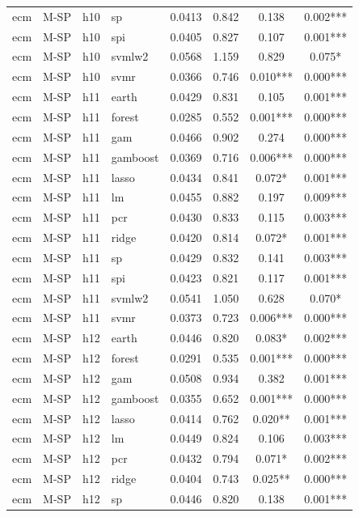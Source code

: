 \begin{ThreePartTable}
\begin{longtable}[t]{llclcccc}
ecm & M-SP & h10 & sp & 0.0413 & 0.842 & 0.138 & 0.002***\\
ecm & M-SP & h10 & spi & 0.0405 & 0.827 & 0.107 & 0.001***\\
ecm & M-SP & h10 & svmlw2 & 0.0568 & 1.159 & 0.829 & 0.075*\\
ecm & M-SP & h10 & svmr & 0.0366 & 0.746 & 0.010*** & 0.000***\\
\addlinespace
ecm & M-SP & h11 & earth & 0.0429 & 0.831 & 0.105 & 0.001***\\
ecm & M-SP & h11 & forest & 0.0285 & 0.552 & 0.001*** & 0.000***\\
ecm & M-SP & h11 & gam & 0.0466 & 0.902 & 0.274 & 0.000***\\
ecm & M-SP & h11 & gamboost & 0.0369 & 0.716 & 0.006*** & 0.000***\\
ecm & M-SP & h11 & lasso & 0.0434 & 0.841 & 0.072* & 0.001***\\
ecm & M-SP & h11 & lm & 0.0455 & 0.882 & 0.197 & 0.009***\\
ecm & M-SP & h11 & pcr & 0.0430 & 0.833 & 0.115 & 0.003***\\
ecm & M-SP & h11 & ridge & 0.0420 & 0.814 & 0.072* & 0.001***\\
ecm & M-SP & h11 & sp & 0.0429 & 0.832 & 0.141 & 0.003***\\
ecm & M-SP & h11 & spi & 0.0423 & 0.821 & 0.117 & 0.001***\\
ecm & M-SP & h11 & svmlw2 & 0.0541 & 1.050 & 0.628 & 0.070*\\
ecm & M-SP & h11 & svmr & 0.0373 & 0.723 & 0.006*** & 0.000***\\
\addlinespace
ecm & M-SP & h12 & earth & 0.0446 & 0.820 & 0.083* & 0.002***\\
ecm & M-SP & h12 & forest & 0.0291 & 0.535 & 0.001*** & 0.000***\\
ecm & M-SP & h12 & gam & 0.0508 & 0.934 & 0.382 & 0.001***\\
ecm & M-SP & h12 & gamboost & 0.0355 & 0.652 & 0.001*** & 0.000***\\
ecm & M-SP & h12 & lasso & 0.0414 & 0.762 & 0.020** & 0.001***\\
ecm & M-SP & h12 & lm & 0.0449 & 0.824 & 0.106 & 0.003***\\
ecm & M-SP & h12 & pcr & 0.0432 & 0.794 & 0.071* & 0.002***\\
ecm & M-SP & h12 & ridge & 0.0404 & 0.743 & 0.025** & 0.000***\\
ecm & M-SP & h12 & sp & 0.0446 & 0.820 & 0.138 & 0.001***\\

\end{longtable}
\end{ThreePartTable}
